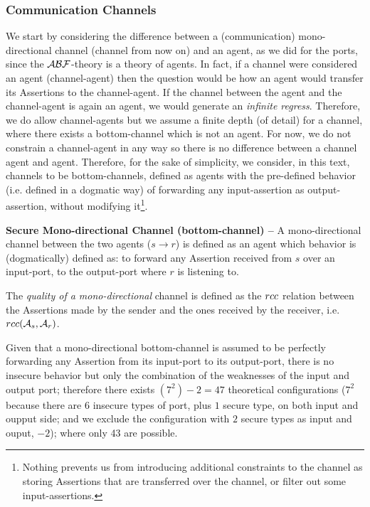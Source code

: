 \subsubsection{Communication Channels}
We start by considering the difference between a (communication)
mono-directional channel (channel from now on) and an agent, as we did for the
ports, since the $\mathcal{A}\mathcal{B}\mathcal{F}$-theory is a theory of agents.  In fact, if a channel
were considered an agent (channel-agent) then the question would be how an
agent would transfer its Assertions to the channel-agent. If the channel
between the agent and the channel-agent is again an agent, we would generate an
\emph{infinite regress}. Therefore, we do allow channel-agents but we assume a
finite depth (of detail) for a channel, where there exists a bottom-channel
which is not an agent. For now, we do not constrain a channel-agent in any way
so there is no difference between a channel agent and agent. Therefore, for the
sake of simplicity, we consider, in this text, channels to be bottom-channels,
defined as agents with the pre-defined behavior (i.e. defined in a dogmatic
way) of forwarding any input-assertion as output-assertion, without modifying it\footnote{Nothing
prevents us from introducing additional constraints to the channel as storing
Assertions that are transferred over the channel, or filter out some
input-assertions.}.

\begin{definition}{\bf Secure Mono-directional Channel (bottom-channel) --}\label{def:monochannel}
	A mono-directional channel between the two agents ($s \rightarrow r$) is defined as 
	an agent which behavior is (dogmatically) defined as: to forward any Assertion received from $s$ over an input-port, to  
	the output-port where $r$ is listening to.
\end{definition}
The \emph{quality of a mono-directional} channel is defined as the 
$rcc$ relation between the Assertions made by the sender and the ones received by the receiver, i.e. $rcc(\mathcal{A}_s,\mathcal{A}_r)$.

Given that a mono-directional bottom-channel is assumed to be perfectly
forwarding any Assertion from its input-port to its output-port, there is no
insecure behavior but only the combination of the weaknesses of the input and
output port; therefore there exists $(7^2)-2=47$ theoretical configurations
($7^2$ because there are $6$ insecure types of port, plus $1$ secure type, on both input and oupput
side; and we exclude the configuration with $2$ secure types as input
and ouput, $-2$); where only 43 are possible.

